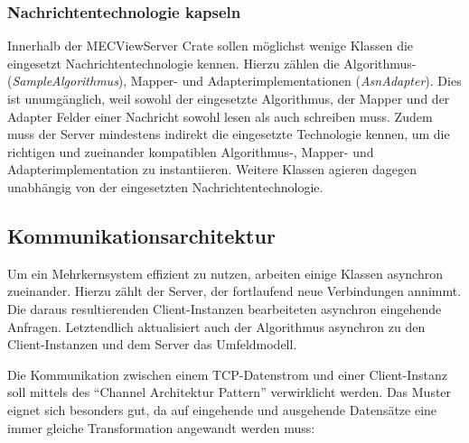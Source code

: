 \subsubsection{Nachrichtentechnologie kapseln}

Innerhalb der MECViewServer Crate sollen möglichst wenige Klassen die eingesetzt Nachrichtentechnologie kennen.
Hierzu zählen die Algorithmus- (\textit{SampleAlgorithmus}), Mapper- und Adapterimplementationen (\textit{AsnAdapter}).
Dies ist unumgänglich, weil sowohl der eingesetzte Algorithmus, der Mapper und der Adapter Felder einer Nachricht sowohl lesen als auch schreiben muss.
Zudem muss der Server mindestens indirekt die eingesetzte Technologie kennen, um die richtigen und zueinander kompatiblen Algorithmus-, Mapper- und Adapterimplementation zu instantiieren.
Weitere Klassen agieren dagegen unabhängig von der eingesetzten Nachrichtentechnologie.

\subsection{Kommunikationsarchitektur}
\label{design:communication:architecture}
\label{design:communication:architecture:async}

Um ein Mehrkernsystem effizient zu nutzen, arbeiten einige Klassen asynchron zueinander.
Hierzu zählt der Server, der fortlaufend neue Verbindungen annimmt.
Die daraus resultierenden Client-Instanzen bearbeiteten asynchron eingehende Anfragen.
Letztendlich aktualisiert auch der Algorithmus asynchron zu den Client-Instanzen und dem Server das Umfeldmodell.

Die Kommunikation zwischen einem TCP-Datenstrom und einer Client-Instanz soll mittels des \enquote{Channel Architektur Pattern} \cite[157]{douglass2003real} verwirklicht werden.
Das Muster eignet sich besonders gut, da auf eingehende und ausgehende Datensätze eine immer gleiche Transformation angewandt werden muss:

